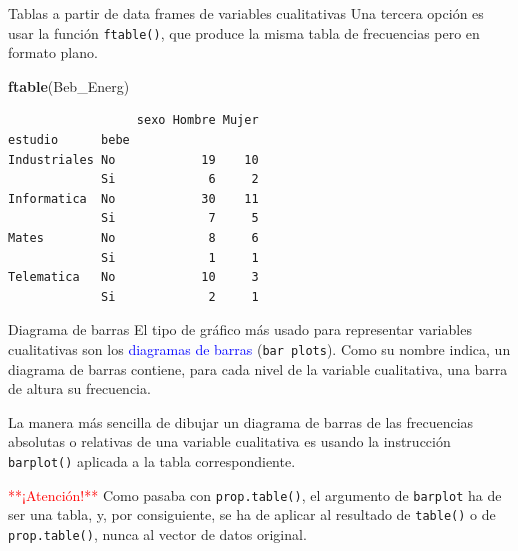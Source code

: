 \documentclass[
  ignorenonframetext,
]{beamer}
\newenvironment{Shaded}{\begin{snugshade}}{\end{snugshade}}
\newcommand{\FunctionTok}[1]{\textcolor[rgb]{0.13,0.29,0.53}{\textbf{#1}}}
\newcommand{\NormalTok}[1]{#1}
\newcommand\blue[1]{\textcolor{blue}{#1}}
\newcommand\red[1]{\textcolor{red}{#1}}
\begin{document}
\begin{frame}[fragile]{Tablas a partir de data frames de variables
cualitativas}
\label{tablas-a-partir-de-data-frames-de-variables-cualitativas-9}
Una tercera opción es usar la función \texttt{ftable()}, que produce la
misma tabla de frecuencias pero en formato plano.

\begin{Shaded}
\begin{Highlighting}[]
\FunctionTok{ftable}\NormalTok{(Beb\_Energ)}
\end{Highlighting}
\end{Shaded}

\begin{verbatim}
                  sexo Hombre Mujer
estudio      bebe                  
Industriales No            19    10
             Si             6     2
Informatica  No            30    11
             Si             7     5
Mates        No             8     6
             Si             1     1
Telematica   No            10     3
             Si             2     1
\end{verbatim}
\end{frame}

\begin{frame}[fragile]{Diagrama de barras}
\label{diagrama-de-barras}
El tipo de gráfico más usado para representar variables cualitativas son
los \blue{diagramas de barras} (\texttt{bar\ plots}). Como su nombre
indica, un diagrama de barras contiene, para cada nivel de la variable
cualitativa, una barra de altura su frecuencia.

La manera más sencilla de dibujar un diagrama de barras de las
frecuencias absolutas o relativas de una variable cualitativa es usando
la instrucción \texttt{barplot()} aplicada a la tabla correspondiente.

\red{**¡Atención!**} Como pasaba con \texttt{prop.table()}, el argumento
de \texttt{barplot} ha de ser una tabla, y, por consiguiente, se ha de
aplicar al resultado de \texttt{table()} o de \texttt{prop.table()},
nunca al vector de datos original.
\end{frame}
\end{document}
